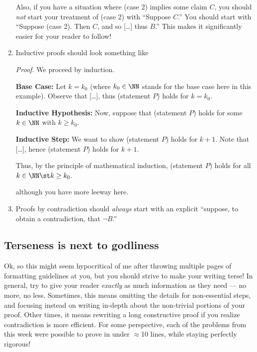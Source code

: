 \documentclass{fkpset}
\begin{document}
\begin{enumerate}[label=(\arabic*)]

  Also, if you have a situation where (case 2) implies some claim $C$, you
  should \emph{not} start your treatment of (case 2) with ``Suppose $C$.''
  You should start with ``Suppose (case 2). Then $C$, and so [\ldots] thus
  $B$.'' This makes it significantly easier for your reader to follow!
  \item Inductive proofs should look something like
    \begin{leftbar}
      \emph{Proof.} We proceed by induction.

      \textbf{Base Case:} Let $k = k_0$ (where $k_0 \in \NN$ stands for the base
      case here in this example). Observe that [\ldots], thus (statement $P$)
      holds for $k = k_0$. \cmark

      \textbf{Inductive Hypothesis:} Now, suppose that (statement $P$) holds for
      some $k \in \NN$ with $k \geq k_0$.

      \textbf{Inductive Step:} We want to show (statement $P$) holds for $k+1$.
      Note that [\ldots], hence (statement $P$) holds for $k+1$. \cmark

      Thus, by the principle of mathematical induction, (statement $P$) holds
      for all $k \in \NN \st k \geq k_0$.
    \end{leftbar}
    although you have more leeway here.
  \item Proofs by contradiction should \emph{always} start with an explicit
    ``suppose, to obtain a contradiction, that $\neg B$.''
\end{enumerate}
\subsection{Terseness is next to godliness}
Ok, so this might seem hypocritical of me after throwing multiple pages of
formatting guidelines at you, but you should strive to make your writing terse!
In general, try to give your reader \emph{exactly} as much information as they
need --- no more, no less. Sometimes, this means omitting the details for
non-essential steps, and focusing instead on writing in-depth about the
non-trivial portions of your proof. Other times, it means rewriting a long
constructive proof if you realize contradiction is more efficient. For some
perspective, each of the problems from this week were possible to prove in under
$\approx$10 lines, while staying perfectly rigorous!
\end{document}
